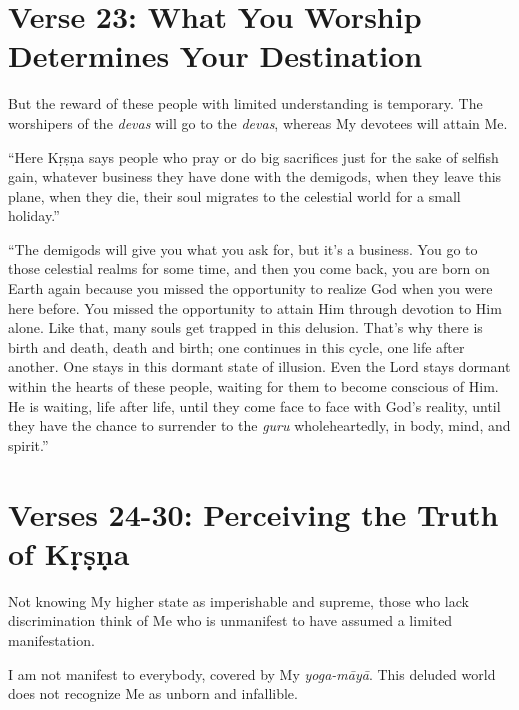 \section{Verse 23: What You Worship Determines Your Destination}\label{sec-verse-23-what-you-worship-determines-your-destination}

{But the reward of these people with limited understanding is temporary. The worshipers of the \textit{devas} will go to the \textit{devas}, whereas My devotees will attain Me.}

\enquote{Here Kṛṣṇa says people who pray or do big sacrifices just for the sake of selfish gain, whatever business they have done with the demigods, when they leave this plane, when they die, their soul migrates to the celestial world for a small holiday.}

\enquote{The demigods will give you what you ask for, but it’s a business. You go to those celestial realms for some time, and then you come back, you are born on Earth again because you missed the opportunity to realize God when you were here before. You missed the opportunity to attain Him through devotion to Him alone. Like that, many souls get trapped in this delusion. That’s why there is birth and death, death and birth; one continues in this cycle, one life after another. One stays in this dormant state of illusion. Even the Lord stays dormant within the hearts of these people, waiting for them to become conscious of Him. He is waiting, life after life, until they come face to face with God’s reality, until they have the chance to surrender to the \textit{guru} wholeheartedly, in body, mind, and spirit.}

\section{Verses 24-30: Perceiving the Truth of Kṛṣṇa}\label{sec-verses-24-30-perceiving-the-truth-of-krsna}

{Not knowing My higher state as imperishable and supreme, those who lack discrimination think of Me who is unmanifest to have assumed a limited manifestation.}

{I am not manifest to everybody, covered by My \textit{yoga-māyā}. This deluded world does not recognize Me as unborn and infallible.}

